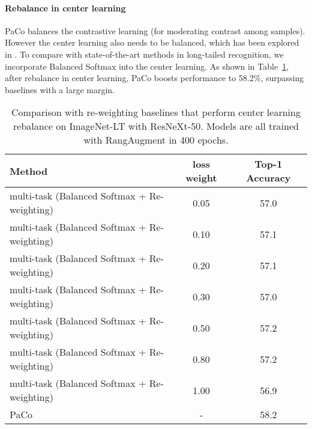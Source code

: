 \documentclass[10pt,twocolumn,letterpaper]{article}
\begin{document}
\paragraph{Rebalance in center learning}
PaCo balances the contrastive learning (for moderating contrast among samples). However the center learning also needs to be balanced, which has been explored in \cite{DBLP:journals/nn/BudaMM18,DBLP:conf/cvpr/HuangLLT16,DBLP:conf/cvpr/CuiJLSB19, he2009learning,chawla2002smote, shen2016relay, DBLP:conf/nips/RenYSMZYL20, DBLP:conf/iclr/KangXRYGFK20, DBLP:journals/corr/abs-2010-01809, DBLP:journals/corr/abs-2101-10633, DBLP:conf/nips/TangHZ20,duggal2020elf}. To compare with state-of-the-art methods in long-tailed recognition, we incorporate Balanced Softmax \cite{DBLP:conf/nips/RenYSMZYL20} into the center learning. As shown in Table~\ref{tab:ablation_center_rebalance_supp}, after rebalance in center learning, PaCo boosts performance to 58.2\%, surpassing baselines with a large margin. 

\begin{table}[t]
	\centering
	\caption{Comparison with re-weighting baselines that perform center learning rebalance on ImageNet-LT with ResNeXt-50. Models are all trained with RangAugment in 400 epochs.}
	\label{tab:ablation_center_rebalance_supp}
	\vspace{0pt}
	{
		\begin{tabular}{lcc}
			\toprule
			Method  &loss weight &Top-1 Accuracy \\
			\midrule
			multi-task (Balanced Softmax \!+\! Re-weighting)      &0.05 &57.0  \\
			multi-task (Balanced Softmax \!+\! Re-weighting)      &0.10 &57.1  \\
			multi-task (Balanced Softmax \!+\! Re-weighting)      &0.20 &57.1  \\
			multi-task (Balanced Softmax \!+\! Re-weighting)      &0.30 &57.0  \\
			multi-task (Balanced Softmax \!+\! Re-weighting)      &0.50 &57.2  \\
			multi-task (Balanced Softmax \!+\! Re-weighting)      &0.80 &57.2  \\
			multi-task (Balanced Softmax \!+\! Re-weighting)      &1.00 &56.9  \\
			\midrule
			PaCo                &- &58.2 \\
			\bottomrule
		\end{tabular}
	}
\end{table}
\end{document}
